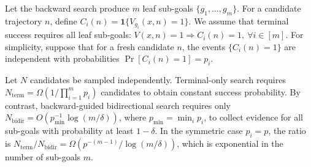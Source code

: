 Let the backward search produce $m$ leaf sub-goals $\{g_1,\ldots,g_m\}$. For a candidate trajectory $n$, define $C_i(n)=\mathbf{1}\{V_{g_i}(x,n)=1\}$. We assume that terminal success requires all leaf sub-goals: $V(x,n)=1 \Rightarrow C_i(n)=1,\ \forall i\in[m]$. For simplicity, suppose that for a fresh candidate $n$, the events $\{C_i(n)=1\}$ are independent with probabilities $\Pr[C_i(n)=1]=p_i$.

\begin{theorem}
\label{thm:bidir}
Let $N$ candidates be sampled independently. Terminal-only search requires
$N_{\mathrm{term}} = \Omega\!\left(1 / \prod_{i=1}^m p_i\right)$
candidates to obtain constant success probability. By contrast, backward-guided bidirectional search requires only
$N_{\mathrm{bidir}} = O\!\left(p_{\min}^{-1}\log(m/\delta)\right)$,
where $p_{\min}=\min_i p_i$,
to collect evidence for all sub-goals with probability at least $1-\delta$. In the symmetric case $p_i=p$, the ratio is
$N_{\mathrm{term}} / N_{\mathrm{bidir}} = \Omega\!\left(p^{-(m-1)} / \log(m/\delta)\right)$,
which is exponential in the number of sub-goals $m$.
\end{theorem}
